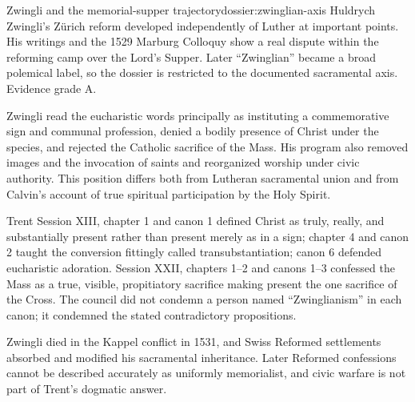\begin{heresydossier}{Zwingli and the memorial-supper trajectory}{dossier:zwinglian-axis}
\objectfield Huldrych Zwingli's Z\"urich reform developed independently of Luther at important points. His writings and the 1529 Marburg Colloquy show a real dispute within the reforming camp over the Lord's Supper. Later ``Zwinglian'' became a broad polemical label, so the dossier is restricted to the documented sacramental axis. Evidence grade A.

\propositionfield Zwingli read the eucharistic words principally as instituting a commemorative sign and communal profession, denied a bodily presence of Christ under the species, and rejected the Catholic sacrifice of the Mass. His program also removed images and the invocation of saints and reorganized worship under civic authority. This position differs both from Lutheran sacramental union and from Calvin's account of true spiritual participation by the Holy Spirit.

\responsefield Trent Session XIII, chapter 1 and canon 1 defined Christ as truly, really, and substantially present rather than present merely as in a sign; chapter 4 and canon 2 taught the conversion fittingly called transubstantiation; canon 6 defended eucharistic adoration. Session XXII, chapters 1--2 and canons 1--3 confessed the Mass as a true, visible, propitiatory sacrifice making present the one sacrifice of the Cross. The council did not condemn a person named ``Zwinglianism'' in each canon; it condemned the stated contradictory propositions.

\aftermathfield Zwingli died in the Kappel conflict in 1531, and Swiss Reformed settlements absorbed and modified his sacramental inheritance. Later Reformed confessions cannot be described accurately as uniformly memorialist, and civic warfare is not part of Trent's dogmatic answer.
\end{heresydossier}

